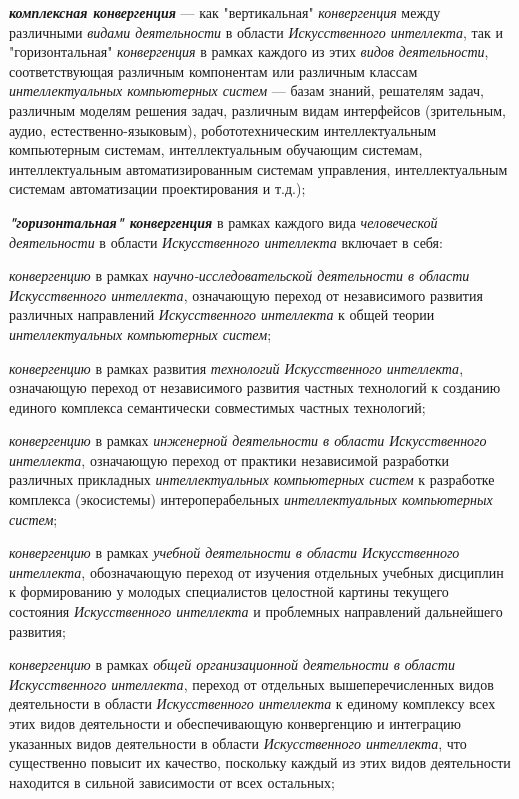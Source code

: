 \begin{textitemize}
	\item
	\textbf{\textit{комплексная конвергенция}} --- как "вертикальная"{} \textit{конвергенция} между различными \textit{видами деятельности} в области \textit{Искусственного интеллекта}, так и "горизонтальная"{} \textit{конвергенция} в рамках каждого из этих \textit{видов деятельности}, соответствующая различным компонентам или различным классам \textit{интеллектуальных компьютерных систем} --- базам знаний, решателям задач, различным моделям решения задач, различным видам интерфейсов (зрительным, аудио, естественно-языковым), робототехническим интеллектуальным компьютерным системам, интеллектуальным обучающим системам, интеллектуальным автоматизированным системам управления, интеллектуальным системам автоматизации проектирования и т.д.);
	\item
	\textbf{\textit{"горизонтальная"{} конвергенция}} в рамках каждого вида \textit{человеческой деятельности} в области \textit{Искусственного интеллекта} включает в себя:
	
	\begin{textitemize}
		\item
		\textit{конвергенцию} в рамках \textit{научно-исследовательской деятельности в области Искусственного интеллекта}, означающую переход от независимого развития различных направлений \textit{Искусственного интеллекта} к общей теории \textit{интеллектуальных компьютерных систем};
		\item
		\textit{конвергенцию} в рамках развития \textit{технологий Искусственного интеллекта}, означающую переход от независимого развития частных технологий к созданию единого комплекса семантически совместимых частных технологий;
		\item
		\textit{конвергенцию} в рамках \textit{инженерной деятельности в области Искусственного интеллекта}, означающую переход от практики независимой разработки различных прикладных \textit{интеллектуальных компьютерных систем} к разработке комплекса (экосистемы) интероперабельных \textit{интеллектуальных компьютерных систем};
		\item
		\textit{конвергенцию} в рамках \textit{учебной деятельности в области Искусственного интеллекта}, обозначающую переход от изучения отдельных учебных дисциплин к формированию у молодых специалистов целостной картины текущего состояния \textit{Искусственного интеллекта} и проблемных направлений дальнейшего развития;
		\item
		\textit{конвергенцию} в рамках \textit{общей организационной деятельности в области Искусственного интеллекта}, переход от отдельных вышеперечисленных видов деятельности в области \textit{Искусственного интеллекта} к единому комплексу всех этих видов деятельности и обеспечивающую конвергенцию и интеграцию указанных видов деятельности в области \textit{Искусственного интеллекта}, что существенно повысит их качество, поскольку каждый из этих видов деятельности находится в сильной зависимости от всех остальных;
	\end{textitemize}
	

\end{textitemize}
